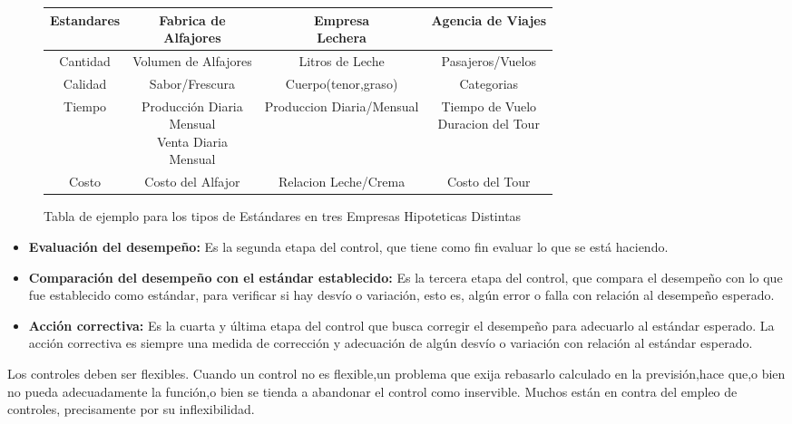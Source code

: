 \documentclass[12pt,letterpaper]{article}
\begin{document}
\begin{figure}[h]
\begin{adjustbox}{width=\textwidth}
\begin{tabular}{|c|c|c|c|}

\hline 
Estandares & \thead{Fabrica de \\ Alfajores} & \thead{Empresa\\ Lechera} & Agencia de Viajes \\ 
\hline 
Cantidad & Volumen de Alfajores & Litros de Leche & Pasajeros/Vuelos \\ 
\hline 
Calidad & Sabor/Frescura & Cuerpo(tenor,graso) & Categorias \\ 
\hline 
Tiempo & \thead{Producción Diaria\\Mensual\\Venta Diaria\\Mensual}  & Produccion Diaria/Mensual & \thead{Tiempo de Vuelo\\Duracion del Tour} \\ 
\hline 
Costo & Costo del Alfajor & Relacion Leche/Crema & Costo del Tour \\ 
\hline 
\end{tabular} 
\end{adjustbox}
\caption{Tabla de ejemplo para los tipos de Estándares en tres Empresas Hipoteticas Distintas}
\end{figure}

\begin{itemize}
\item \textbf{Evaluación del desempeño:} Es la segunda etapa del control, que tiene como fin evaluar lo que se está haciendo.
\item \textbf{Comparación del desempeño con el estándar establecido:} Es la tercera etapa del control, que compara el desempeño con lo que fue establecido como estándar, para verificar si hay desvío o variación, esto es, algún error o falla con relación al desempeño esperado.
\item \textbf{Acción correctiva:} Es la cuarta y última etapa del control que busca corregir el desempeño para adecuarlo al estándar esperado. La acción correctiva es siempre una medida de corrección y adecuación de algún desvío o variación con relación al estándar esperado.
\end{itemize}
Los controles deben ser flexibles. Cuando un control no es flexible,un
problema que exija rebasarlo calculado en la previsión,hace que,o bien no
pueda adecuadamente la función,o bien se tienda a abandonar el control
como inservible. Muchos están en contra del empleo de controles,
precisamente por su inflexibilidad.
\end{document}
